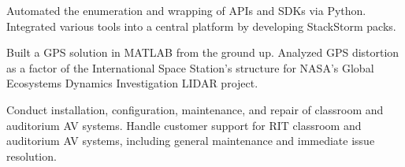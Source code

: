 \documentclass[9pt,letter]{altacv}
\begin{document}

\begin{fullwidth}
\marginpar{\makesidebarheader}
    \vspace*{-1\baselineskip}
\makecvheader
\end{fullwidth}
\vspace{.65\baselineskip}


Automated the enumeration and wrapping of APIs and SDKs via Python.
Integrated various tools into a central platform by developing StackStorm packs.

\divider

Built a GPS solution in MATLAB from the ground up. Analyzed GPS distortion as a factor of the International Space Station's structure for NASA's Global Ecosystems Dynamics Investigation LIDAR project.


\divider

Conduct installation, configuration, maintenance, and repair of classroom and auditorium AV systems.
Handle customer support for RIT classroom and auditorium AV systems, including general maintenance and immediate issue resolution.
\end{document}

